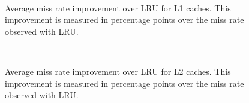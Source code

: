 \begin{figure}[htb]
\begin{center}
\ 
\caption{Average miss rate improvement over LRU for L1 caches. This improvement is measured in percentage points over the miss rate observed with LRU.}
\label{f:l1_miss_rate}
\end{center}
\end{figure}

\begin{figure}[htb]
\begin{center}
\ 
\caption{Average miss rate improvement over LRU for L2 caches. This improvement is measured in percentage points over the miss rate observed with LRU.}
\label{f:l2_miss_rate}
\end{center}
\end{figure}
